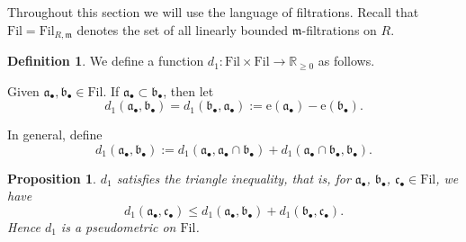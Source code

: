 \documentclass[11pt, leqno]{amsart}%
\theoremstyle{plain}
\newtheorem{proposition}[theorem]{Proposition}
\theoremstyle{definition}
\newtheorem{defn}[theorem]{Definition}
\theoremstyle{remark}
\newcommand{\bR}{\mathbb{R}}
\newcommand{\fa}{\mathfrak{a}}
\newcommand{\fb}{\mathfrak{b}}
\newcommand{\fc}{\mathfrak{c}}
\newcommand{\fm}{\mathfrak{m}}
\newcommand{\e}{\mathrm{e}}
\newcommand{\Fil}{\mathrm{Fil}}
\numberwithin{equation}{section}
\begin{document}
Throughout this section we will use the language of filtrations. Recall that $\Fil=\Fil_{R,\fm}$ denotes the set of all linearly bounded $\fm$-filtrations on $R$.

\begin{defn}\label{defn:d_1 metric}
    We define a function $d_1:\Fil\times\Fil\to \bR_{\ge 0}$ as follows.
	
    Given $\fa_\bullet, \fb_\bullet\in\Fil$. If $\fa_\bullet\subset\fb_\bullet$, then let
    \begin{equation}\label{eqn:limit defn for d_1}
        d_1(\fa_\bullet,\fb_\bullet)=
        d_1(\fb_\bullet,\fa_\bullet):=\e(\fa_\bullet)-\e(\fb_\bullet).
    \end{equation}
	
    In general, define 		
        \begin{equation}\label{eqn:d_1 additive}
        d_1(\fa_\bullet,\fb_\bullet):=
        d_1(\fa_\bullet,\fa_\bullet\cap \fb_\bullet)+d_1(\fa_\bullet\cap \fb_\bullet,\fb_\bullet).
    \end{equation}
\end{defn}





\begin{proposition}\label{prop:d_1 is a pseudo metric}
    $d_1$ satisfies the triangle inequality, that is, for $\fa_\bullet$, $\fb_\bullet$,  $\fc_\bullet\in\Fil$, we have
    \begin{equation}\label{eqn:triangle}
        d_1(\fa_\bullet,\fc_\bullet)\le d_1(\fa_\bullet,\fb_\bullet)+d_1(\fb_\bullet,\fc_\bullet).
    \end{equation}
    Hence $d_1$ is a pseudometric on $\Fil$.
\end{proposition}
\end{document}
